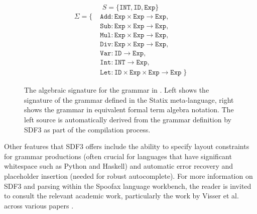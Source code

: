 \begin{figure}
  \centering
  \begin{subfigure}{.45\textwidth}
    \centering
    \usebox{\sdfsignaturebox}
  \end{subfigure}\hfill%
  \begin{subfigure}{.5\textwidth}
    \centering
    $$ S = \{\texttt{INT}, \texttt{ID}, \texttt{Exp}\} $$
    \begin{equation*}
    \begin{aligned}
    \Sigma = \{ \; & \texttt{Add} : \texttt{Exp} \times \texttt{Exp} \to \texttt{Exp}, \\
                  & \texttt{Sub} : \texttt{Exp} \times \texttt{Exp} \to \texttt{Exp}, \\
                  & \texttt{Mul} : \texttt{Exp} \times \texttt{Exp} \to \texttt{Exp}, \\
                  & \texttt{Div} : \texttt{Exp} \times \texttt{Exp} \to \texttt{Exp}, \\
                  & \texttt{Var} : \texttt{ID} \to \texttt{Exp}, \\
                  & \texttt{Int} : \texttt{INT} \to \texttt{Exp}, \\
                  & \texttt{Let} : \texttt{ID} \times \texttt{Exp} \times \texttt{Exp} \to \texttt{Exp} \; \}
    \end{aligned}
    \end{equation*}
  \end{subfigure}
  \caption{The algebraic signature for the grammar in . Left shows the signature of the grammar defined in the Statix meta-language, right shows the grammar in equivalent formal term algebra notation. The left source is automatically derived from the grammar definition by SDF3 as part of the compilation process.}
  \label{fig:sdf3_example_signature}
\end{figure}

Other features that SDF3 offers include the ability to specify layout constraints for grammar productions (often crucial for languages that have significant whitespace such as Python and Haskell) and automatic error recovery and placeholder insertion (needed for robust autocomplete). For more information on SDF3 and parsing within the Spoofax language workbench, the reader is invited to consult the relevant academic work, particularly the work by Visser et al. across various papers \cite{KatsV10a, Spoofax2021, Amorim2019, AmorimV20,KallebergV07, WachsmuthKV14}.

